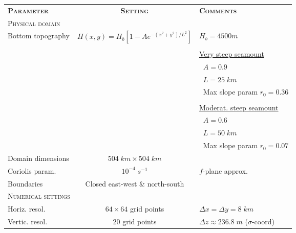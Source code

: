 \documentclass[authoryear]{elsarticle}
\begin{document}
\begin{table}[htp]
	\centering
	\hspace{-7cm}
	\begin{scriptsize}
		\begin{tabular}{lcl}
			\cmidrule[0.5pt]{1-3}
			\textsc{\textbf{Parameter}} & \textsc{\textbf{Setting}} & \textsc{\textbf{Comments}} \\
			\cmidrule[0.5pt]{1-3}
            \cellcolor{gray!25}\textsc{Physical domain} & & \\           
			Bottom topography & $H(x,y) = H_{b}[1-Ae^{-(x^2 + y^2)/L^2}]$ & $H_{b} = 4500 m$ \\
			           & & \\
			           &                                             & \underline{Very steep seamount} \\
			           &                                             & $\;\;A = 0.9$  \\ 
			           &                                             & $\;\;L = 25 \; km$  \\
			           &                                             & $\;\;$Max slope param $r_0 = 0.36$ \\
			           & & \\
			           &                                             & \underline{Moderat. steep seamount} \\      
			           &                                             & $\;\;A = 0.6$ \\
			           &                                             & $\;\;L = 50 \; km$ \\ 
			           &                                             & $\;\;$Max slope param $r_0 = 0.07$ \\
			Domain dimensions & $504 \;km \times 504 \;km$           & \\             
			Coriolis param. & $10^{-4}\; s^{-1}$                     & $f$-plane approx. \\
			Boundaries & Closed east-west \& north-south             & \\
			\cmidrule[0.5pt]{1-3}           
			\cellcolor{gray!25}\textsc{Numerical settings} & & \\  
			Horiz. resol.  & $64 \times 64$ grid points            & $\Delta x = \Delta y = 8 \; km$ \\
			Vertic. resol. & $20$ grid points                      & $\Delta z \approx 236.8 \; m$ ($\sigma$-coord) \\

\end{tabular}
\end{scriptsize}
\end{table}
\end{document}
